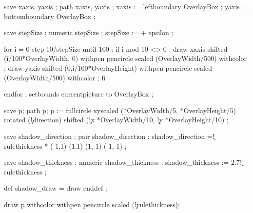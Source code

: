   save xaxis, yaxis ; path xaxis, yaxis ;
  xaxis := leftboundary OverlayBox ;
  yaxis := bottomboundary OverlayBox ;


  save stepSize ; numeric stepSize ;
  stepSize :=  + epsilon ;

  for i = 0 step 10/stepSize until 100 :
    if i mod 10 <> 0 :
      draw xaxis shifted (i/100*OverlayWidth, 0) 
                 withpen pencircle scaled (OverlayWidth/500) 
                 withcolor \MPcolor\simpleslidesGridColor ;
      draw yaxis shifted (0,i/100*OverlayHeight) 
                 withpen pencircle scaled (OverlayWidth/500) 
                 withcolor \MPcolor\simpleslidesGridColor ;
    fi 

  endfor ;
  setbounds currentpicture to OverlayBox ;
\stopuseMPgraphic



  save p; path p;
  p := fullcircle xyscaled 
       (*OverlayWidth/5,
        *OverlayHeight/5) 
       rotated (\simpleslidesPictureParameter\c!direction) 
       shifted
       (\simpleslidesPictureParameter\c!x *OverlayWidth/10,
        \simpleslidesPictureParameter\c!y *OverlayHeight/10)  ;

  \ifcase \simpleslidesShadow \else
  
  save shadow_direction ; pair shadow_direction ;
  shadow_direction =\simpleslidesPictureParameter\c!rulethickness * 
     \ifcase \simpleslidesShadow \or
          (-1,1) \or (1,1) \or (1,-1) \or (-1,-1) \fi ;


  save shadow_thickness ; numeric shadow_thickness ;
  shadow_thickness := 2.7\simpleslidesPictureParameter\c!rulethickness ;

  def shadow_draw = draw enddef ;

  \fi

  draw p withcolor  
       withpen pencircle scaled (\simpleslidesPictureParameter\c!rulethickness);

